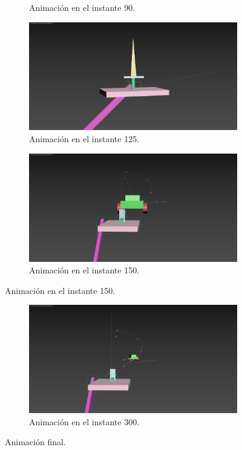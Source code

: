 \begin{figure}[H]
\begin{subfigure}[t]{0.48\textwidth}
        \caption{Animación en el instante 90.}
    \end{subfigure}
    \hfill
    \begin{subfigure}[t]{0.48\textwidth}
        \centering
        \includegraphics[width=\textwidth]{imagenes/resultado/125.png}
        \caption{Animación en el instante 125.}
    \end{subfigure}
    \hfill
    \begin{subfigure}[t]{0.48\textwidth}
        \centering
        \includegraphics[width=\textwidth]{imagenes/resultado/150.png}
        \caption{Animación en el instante 150.}
    \end{subfigure}
\end{figure}

\newpage

\begin{figure}[H]\ContinuedFloat
    \centering
    \begin{subfigure}[t]{0.48\textwidth}
        \centering
        \includegraphics[width=\textwidth]{imagenes/resultado/300.png}
        \caption{Animación en el instante 300.}
    \end{subfigure}
    \caption{Animación final.}
\end{figure}